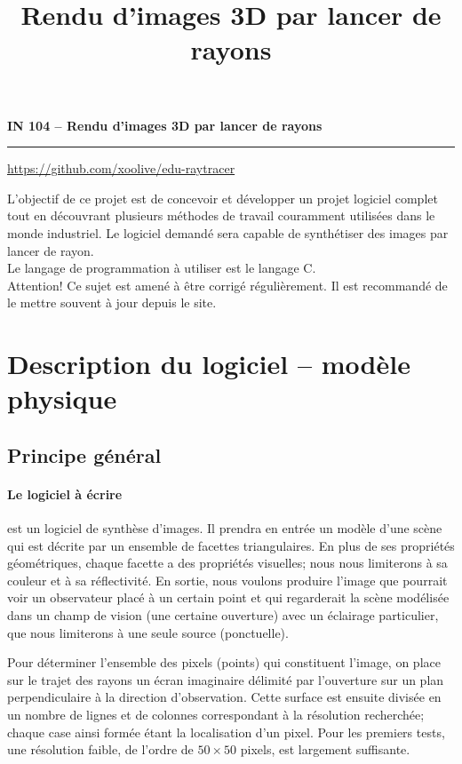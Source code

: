\documentclass[10pt, a4paper ]{article}
\title{Rendu d'images 3D par lancer de rayons}
\begin{document}
\noindent
\textbf{\textsf{\large IN 104 -- Rendu d'images 3D par lancer de rayons }}
\vskip1mm\hrule\url{https://github.com/xoolive/edu-raytracer}


\begin{minipage}{.9\textwidth} \sf L'objectif de ce projet est de concevoir et
    développer un projet logiciel complet tout en découvrant plusieurs méthodes
    de travail couramment utilisées dans le monde industriel. Le logiciel
    demandé sera capable de synthétiser des images par lancer de rayon.\\ Le
    langage de programmation à utiliser est le langage C. \\[5mm]
    {\color{BrickRed} Attention!} \hspace{5mm} Ce sujet est amené à être corrigé
    régulièrement. Il est recommandé de le mettre souvent à jour  depuis le
    site.\end{minipage}


\section{Description du logiciel -- modèle physique}
\subsection{Principe général}

\paragraph{Le logiciel à écrire} est un logiciel de synthèse d'images. Il
prendra en entrée un modèle d'une scène qui est décrite par un ensemble de
facettes triangulaires.  En plus de ses propriétés géométriques, chaque facette
a des propriétés visuelles; nous nous limiterons à sa couleur et à sa
réflectivité.  En sortie, nous voulons produire l'image que pourrait voir un
observateur placé à un certain point et qui regarderait la scène modélisée dans
un champ de vision (une certaine ouverture) avec un éclairage particulier, que
nous limiterons à une seule source (ponctuelle).

Pour déterminer l'ensemble des pixels (points) qui constituent l'image, on place
sur le trajet des rayons un écran imaginaire délimité par l'ouverture sur un
plan perpendiculaire à la direction d'observation. Cette surface est ensuite
divisée en un nombre de lignes et de colonnes correspondant à la résolution
recherchée; chaque case ainsi formée étant la localisation d'un pixel. Pour les
premiers tests, une résolution faible, de l'ordre de $50\times50$ pixels, est
largement suffisante.
\end{document}
